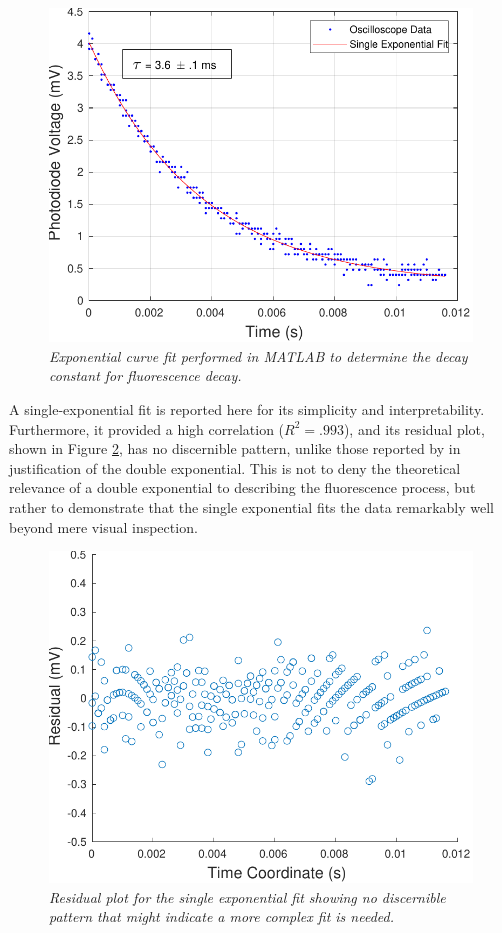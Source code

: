 \documentclass[11pt, a4paper, twocolumn]{article}
\begin{document}
\begin{figure}[]
\includegraphics[width=\linewidth]{decayFit.pdf}
\caption{\textit{Exponential curve fit performed in MATLAB to determine the decay constant for fluorescence decay.}
}
\label{fig:populationInversion}
\end{figure}

A single-exponential fit is reported here for its simplicity and interpretability. Furthermore, it provided a high correlation ($R^2 = .993$), and its residual plot, shown in Figure \ref{fig:decayResiduals}, has no discernible pattern, unlike those reported by \cite{Jones} in justification of the double exponential. This is not to deny the theoretical relevance of a double exponential to describing the fluorescence process, but rather to demonstrate that the single exponential fits the data remarkably well beyond mere visual inspection.

\begin{figure}[]
\includegraphics[width=\linewidth]{decayResiduals.pdf}
\caption{\textit{Residual plot for the single exponential fit showing no discernible pattern that might indicate a more complex fit is needed.}}
\label{fig:decayResiduals}
\end{figure}
\end{document}
